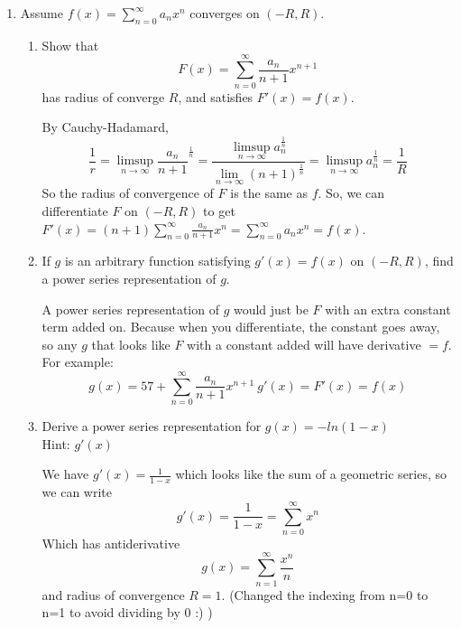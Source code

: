 \documentclass[hidelinks,12pt]{article}
\begin{document}
\begin{enumerate}
\begin{proof}[Proof]
        \end{proof}
    \item Assume $f(x)=\sum_{n=0}^{\infty}a_nx^n$ converges on $(-R,R)$.\begin{enumerate}
        \item Show that 
            \[F(x)=\sum_{n=0}^{\infty}\frac{a_n}{n+1}x^{n+1}\]
            has radius of converge $R$, and satisfies $F'(x)=f(x)$.
            \par\null\par
            By Cauchy-Hadamard, 
            \[\frac{1}{r}=\limsup_{n\to\infty}\frac{a_n}{n+1}^{\frac{1}{n}}=\frac{\limsup_{n\to\infty}a_n^{\frac{1}{n}}}{\lim_{n\to\infty}(n+1)^{\frac{1}{n}}}=\limsup_{n\to\infty}a_n^{\frac{1}{n}}=\frac{1}{R}\]
            So the radius of convergence of $F$ is the same as $f$. So, we can differentiate $F$ on $(-R,R)$ to get $F'(x)=(n+1)\sum_{n=0}^{\infty}\frac{a_n}{n+1}x^{n}=\sum_{n=0}^{\infty}a_nx^n=f(x)$.
            \item If $g$ is an arbitrary function satisfying $g'(x)=f(x)$ on $(-R,R)$, find a power series representation of $g$.
                \par\null\par A power series representation of $g$ would just be $F$ with an extra constant term added on. Because when you differentiate, the constant goes away, so any $g$ that looks like $F$ with a constant added will have derivative $=f$. For example:
                \[g(x)=57+\sum_{n=0}^{\infty}\frac{a_n}{n+1}x^{n+1}\ g'(x)=F'(x)=f(x)\]
            \item Derive a power series representation for $g(x)=-ln(1-x)$
                \\ Hint: $g'(x)$
                \par\null\par We have $g'(x)=\frac{1}{1-x}$ which looks like the sum of a geometric series, so we can write \[g'(x)=\frac{1}{1-x}=\sum_{n=0}^{\infty}x^n\]
                Which has antiderivative \[g(x)=\sum_{n=1}^{\infty}\frac{x^n}{n}\] and radius of convergence $R=1$. (Changed the indexing from n=0 to n=1 to avoid dividing by 0 :) ) 
    \end{enumerate}
\end{enumerate}
\end{document}

